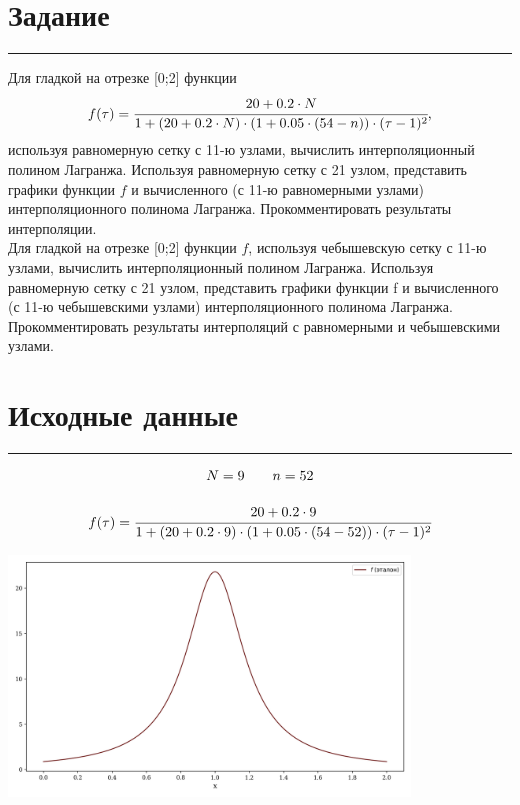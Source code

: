 \documentclass[a4paper, 14pt]{extarticle}
\begin{document}


\section*{Задание}\vspace{-20pt}\rule{\linewidth}{0.1mm}

Для гладкой на отрезке [0;2] функции
\begin{equation*}
  f(\tau) = \cfrac{20 + 0.2 \cdot N}{1 + (20 + 0.2 \cdot N) \cdot (1 + 0.05 \cdot (54 - n)) \cdot (\tau - 1)^2} \text{,}
\end{equation*}
используя равномерную сетку с 11-ю узлами, вычислить интерполяционный полином
Лагранжа. Используя равномерную сетку с 21 узлом, представить графики функции $f$ и
вычисленного (с 11-ю равномерными узлами) интерполяционного полинома Лагранжа.
Прокомментировать результаты интерполяции.\\

Для гладкой на отрезке [0;2] функции $f$, используя чебышевскую сетку с 11-ю
узлами, вычислить интерполяционный полином Лагранжа. Используя равномерную сетку
с 21 узлом, представить графики функции f и вычисленного (с 11-ю чебышевскими
узлами) интерполяционного полинома Лагранжа.\\

Прокомментировать результаты интерполяций с равномерными и чебышевскими
узлами.

\section*{Исходные данные}\vspace{-20pt}\rule{\linewidth}{0.1mm}

\begin{gather*}
  N = 9 \qquad n = 52 \\[1em]
  f(\tau) = \cfrac{20 + 0.2 \cdot 9}{1 + (20 + 0.2 \cdot 9) \cdot (1 + 0.05 \cdot (54 - 52)) \cdot (\tau - 1)^2}
\end{gather*}

\begin{center}
  \includegraphics[width=0.8\textwidth]{ref}
\end{center}
\end{document}
